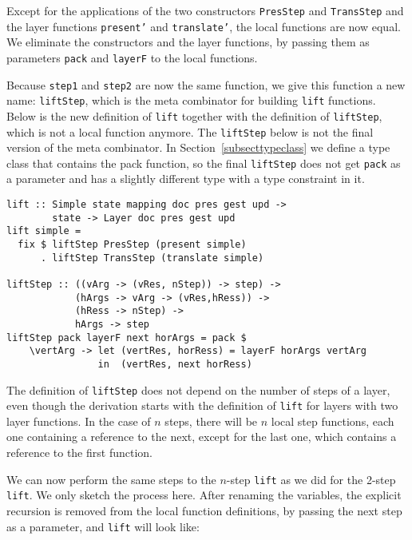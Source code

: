 Except for the applications of the two constructors \texttt{PresStep} and \texttt{TransStep} and the layer functions \texttt{present'} and \texttt{translate'}, the local functions are now equal. We eliminate the constructors and the layer functions, by passing them as parameters \texttt{pack} and \texttt{layerF} to the local functions.

Because \texttt{step1} and \texttt{step2} are now the same function, we give this function a new name: \texttt{liftStep}, which is the meta combinator for building \texttt{lift} functions. Below is the new definition of \texttt{lift} together with the definition of \texttt{liftStep}, which is not a local function anymore. The \texttt{liftStep} below is not the final version of the meta combinator. In Section~\ref{subsecttypeclass} we define a type class that contains the pack function, so the final \texttt{liftStep} does not get \texttt{pack} as a parameter and has a slightly different type with a type constraint in it.

\begin{small}
\begin{verbatim}
lift :: Simple state mapping doc pres gest upd ->
        state -> Layer doc pres gest upd
lift simple = 
  fix $ liftStep PresStep (present simple) 
      . liftStep TransStep (translate simple) 

liftStep :: ((vArg -> (vRes, nStep)) -> step) ->
            (hArgs -> vArg -> (vRes,hRess)) ->
            (hRess -> nStep) ->
            hArgs -> step
liftStep pack layerF next horArgs = pack $
    \vertArg -> let (vertRes, horRess) = layerF horArgs vertArg
                in  (vertRes, next horRess)
\end{verbatim}
\end{small}


The definition of \texttt{liftStep} does not depend on the number of steps of a layer, even though the derivation starts with the definition of \texttt{lift} for layers with two layer functions. In the case of $n$ steps, there will be $n$ local step functions, each one containing a reference to the next, except for the last one, which contains a reference to the first function. 

We can now perform the same steps to the $n$-step \texttt{lift} as we did for the 2-step \texttt{lift}. We only sketch the process here. After renaming the variables, the explicit recursion is removed from the local function definitions, by passing the next step as a parameter, and \texttt{lift} will look like:

